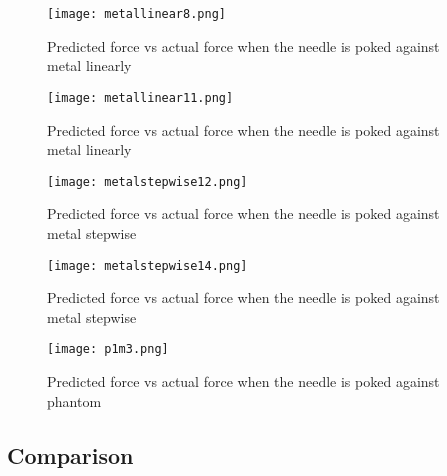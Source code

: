 \begin{figure}
    \centering
    \texttt{[image: metallinear8.png]}
    \caption{Predicted force vs actual force when the needle is poked against metal linearly}
    \label{fig:Metallinear8}
\end{figure}

 \begin{figure}
    \centering
    \texttt{[image: metallinear11.png]}
    \caption{Predicted force vs actual force when the needle is poked against metal linearly}
    \label{fig:Metallinear11}
\end{figure}

 \begin{figure}
    \centering
    \texttt{[image: metalstepwise12.png]}
    \caption{Predicted force vs actual force when the needle is poked against metal stepwise}
    \label{fig:Metalstepwise12}
\end{figure}

 \begin{figure}
    \centering
    \texttt{[image: metalstepwise14.png]}
    \caption{Predicted force vs actual force when the needle is poked against metal stepwise}
    \label{fig:Metalstepwise14}
\end{figure}

 \begin{figure}
    \centering
    \texttt{[image: p1m3.png]}
    \caption{Predicted force vs actual force when the needle is poked against phantom}
    \label{fig:Phantom}
\end{figure}

\subsection{Comparison}

